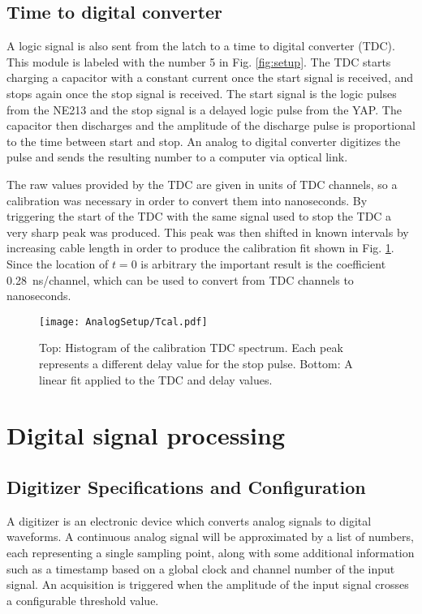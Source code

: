 \documentclass[main.tex]{subfiles}
\begin{document}
\subsection{Time to digital converter}
A logic signal is also sent from the latch to a time to digital converter (TDC). This module is labeled with the number 5 in Fig. \ref{fig:setup}. The TDC starts charging a capacitor with a constant current once the start signal is received, and stops again once the stop signal is received. The start signal is the logic pulses from the NE213 and the stop signal is a delayed logic pulse from the YAP. The capacitor then discharges and the amplitude of the discharge pulse is proportional to the time between start and stop\cite{CAENTDC}. An analog to digital converter digitizes the pulse and sends the resulting number to a computer via optical link.

The raw values provided by the TDC are given in units of TDC channels, so a calibration was necessary in order to convert them into nanoseconds. By triggering the start of the TDC with the same signal used to stop the TDC a very sharp peak was produced. This peak was then shifted in known intervals by increasing cable length in order to produce the calibration fit shown in Fig. \ref{fig:Tcal}. Since the location of $t=0$ is arbitrary the important result is the coefficient \SI{0.28}{\nano\second/channel}, which can be used to convert from TDC channels to nanoseconds.
\begin{figure}[ht]
	\centering
    	\texttt{[image: AnalogSetup/Tcal.pdf]}
        \caption[TDC calibration of analog setup]{Top: Histogram of the calibration TDC spectrum. Each peak represents a different delay value for the stop pulse. Bottom: A linear fit applied to the TDC and delay values.}
	    \label{fig:Tcal} 
\end{figure}

\section{Digital signal processing}
\subsection{Digitizer Specifications and Configuration}
A digitizer is an electronic device which converts analog signals to digital waveforms. A continuous analog signal will be approximated by a list of numbers, each representing a single sampling point, along with some additional information such as a timestamp based on a global clock and channel number of the input signal. An acquisition is triggered when the amplitude of the input signal crosses a configurable threshold value.
\end{document}
